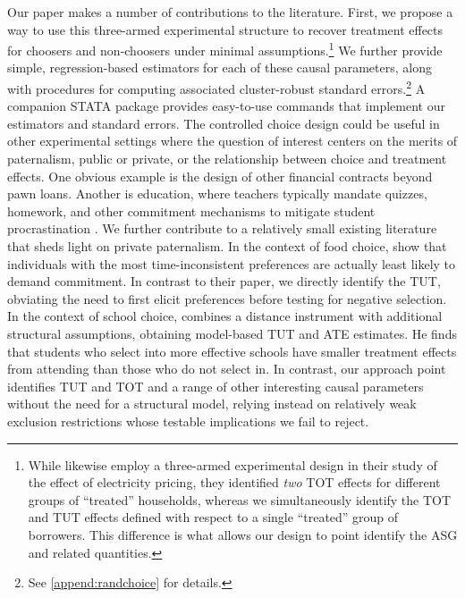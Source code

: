 \documentclass[11pt, a4paper]{article}
\begin{document}
Our paper makes a number of contributions to the literature. First, we propose a way to use this three-armed experimental structure to recover treatment effects for choosers and non-choosers under minimal assumptions.\footnote{While \cite{fowlie2021default} likewise employ a three-armed experimental design in their study of the effect of electricity pricing, they identified \emph{two} TOT effects for different groups of ``treated'' households, whereas we simultaneously identify the TOT and TUT effects defined with respect to a single ``treated'' group of borrowers. This difference is what allows our design to point identify the ASG and related quantities.} 
We further provide simple, regression-based estimators for each of these causal parameters, along with procedures for computing associated cluster-robust standard errors.\footnote{See \ref{append:randchoice} for details.} A companion STATA package provides easy-to-use commands that implement our estimators and standard errors. The controlled choice design could be useful in other experimental settings where the question of interest centers on the merits of paternalism, public or private, or the relationship between choice and treatment effects. One obvious example is the design of other financial contracts beyond pawn loans. Another is education, where teachers typically mandate quizzes, homework, and other commitment mechanisms to mitigate student procrastination \citep{Ariely}. 
We further contribute to a relatively small existing literature that sheds light on private paternalism. In the context of food choice, \cite{Sprenger} show that individuals with the most time-inconsistent preferences are actually least likely to demand commitment. In contrast to their paper, we directly identify the TUT, obviating the need to first elicit preferences before testing for negative selection. In the context of school choice, \cite{Walters} combines a distance instrument with additional structural assumptions, obtaining model-based TUT and ATE estimates. He finds that students who select into more effective schools have smaller treatment effects from attending than those who do not select in. In contrast, our approach point identifies TUT and TOT and a range of other interesting causal parameters without the need for a structural model, relying instead on relatively weak exclusion restrictions whose testable implications we fail to reject.
\end{document}
